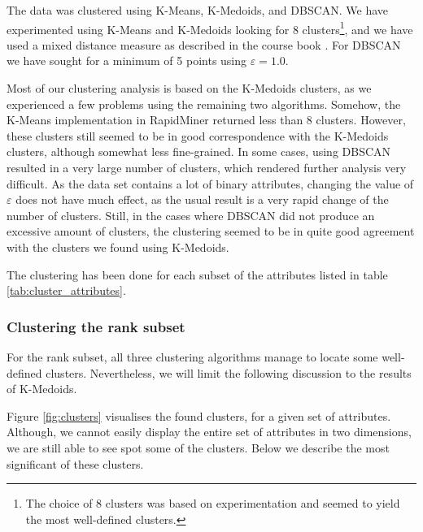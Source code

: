 The data was clustered using {K-Means}, {K-Medoids}, and {DBSCAN}. We have experimented using {K-Means} and {K-Medoids} looking for 8 clusters\footnote{The choice of 8 clusters was based on experimentation and seemed to yield the most well-defined clusters.}, and we have used a mixed distance measure as described in the course book \cite{book}. For {DBSCAN} we have sought for a minimum of 5 points using $\varepsilon = 1.0$.

Most of our clustering analysis is based on the {K-Medoids} clusters, as we experienced a few problems using the remaining two algorithms. Somehow, the {K-Means} implementation in {RapidMiner} returned less than 8 clusters. However, these clusters still seemed to be in good correspondence with the {K-Medoids} clusters, although somewhat less fine-grained. In some cases, using {DBSCAN} resulted in a very large number of clusters, which rendered further analysis very difficult. As the data set contains a lot of binary attributes, changing the value of $\varepsilon$ does not have much effect, as the usual result is a very rapid change of the number of clusters. Still, in the cases where {DBSCAN} did not produce an excessive amount of clusters, the clustering seemed to be in quite good agreement with the clusters we found using {K-Medoids}.

The clustering has been done for each subset of the attributes listed in table \ref{tab:cluster_attributes}.

\subsubsection{Clustering the rank subset}

For the rank subset, all three clustering algorithms manage to locate some well-defined clusters. Nevertheless, we will limit the following discussion to the results of {K-Medoids}. 


Figure \ref{fig:clusters} visualises the found clusters, for a given set of attributes. Although, we cannot easily display the entire set of attributes in two dimensions, we are still able to see spot some of the clusters. Below we describe the most significant of these clusters.

